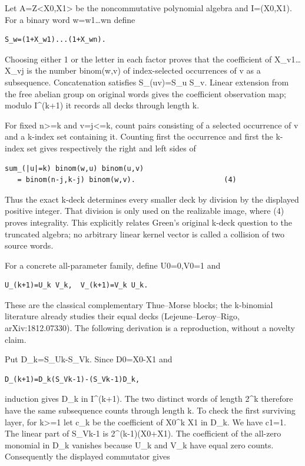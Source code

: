\documentclass[
  10pt,
]{scrreprt}
\begin{document}
Let A=Z\textless X0,X1\textgreater{} be the noncommutative polynomial
algebra and I=(X0,X1). For a binary word w=w1\ldots wn define

\begin{verbatim}
S_w=(1+X_w1)...(1+X_wn).
\end{verbatim}

Choosing either 1 or the letter in each factor proves that the
coefficient of X\_v1\ldots X\_vj is the number binom(w,v) of
index-selected occurrences of v as a subsequence. Concatenation
satisfies S\_(uv)=S\_u S\_v. Linear extension from the free abelian
group on original words gives the coefficient observation map; modulo
I\^{}(k+1) it records all decks through length k.

For fixed n\textgreater=k and \textbar v\textbar=j\textless=k, count
pairs consisting of a selected occurrence of v and a k-index set
containing it. Counting first the occurrence and first the k-index set
gives respectively the right and left sides of

\begin{verbatim}
sum_(|u|=k) binom(w,u) binom(u,v)
   = binom(n-j,k-j) binom(w,v).                     (4)
\end{verbatim}

Thus the exact k-deck determines every smaller deck by division by the
displayed positive integer. That division is only used on the realizable
image, where (4) proves integrality. This explicitly relates Green's
original k-deck question to the truncated algebra; no arbitrary linear
kernel vector is called a collision of two source words.

For a concrete all-parameter family, define U0=0,V0=1 and

\begin{verbatim}
U_(k+1)=U_k V_k,  V_(k+1)=V_k U_k.
\end{verbatim}

These are the classical complementary Thue--Morse blocks; the k-binomial
literature already studies their equal decks (Lejeune--Leroy--Rigo,
arXiv:1812.07330). The following derivation is a reproduction, without a
novelty claim.

Put D\_k=S\_Uk-S\_Vk. Since D0=X0-X1 and

\begin{verbatim}
D_(k+1)=D_k(S_Vk-1)-(S_Vk-1)D_k,
\end{verbatim}

induction gives D\_k in I\^{}(k+1). The two distinct words of length
2\^{}k therefore have the same subsequence counts through length k. To
check the first surviving layer, for k\textgreater=1 let c\_k be the
coefficient of X0\^{}k X1 in D\_k. We have c1=1. The linear part of
S\_Vk-1 is 2\^{}(k-1)(X0+X1). The coefficient of the all-zero monomial
in D\_k vanishes because U\_k and V\_k have equal zero counts.
Consequently the displayed commutator gives
\end{document}
